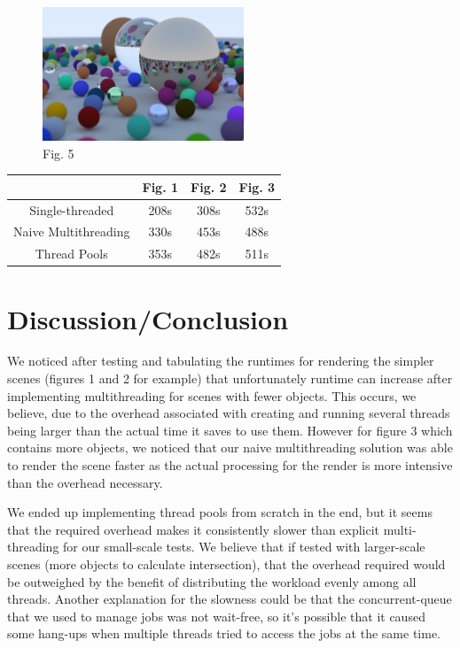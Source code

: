 \documentclass[conference]{IEEEtran}
\begin{document}
\begin{figure}[H]
\includegraphics[width=6cm]{images/FinalRender.png}
\centering\\
Fig. 5
\end{figure}

\begin{center}
\begin{tabular}{||c c c c||} 
 \hline
  & Fig. 1  & Fig. 2 & Fig. 3 \\ [0.5ex] 
 \hline\hline
 Single-threaded & 208s & 308s & 532s \\ 
 \hline
 Naive Multithreading & 330s & 453s & 488s \\
 \hline
 Thread Pools & 353s & 482s & 511s \\
 \hline
\end{tabular}
\end{center}

\section{Discussion/Conclusion}
We noticed after testing and tabulating the runtimes for rendering the simpler scenes (figures 1 and 2 for example) that unfortunately runtime can increase after implementing multithreading for scenes with fewer objects. This occurs, we believe, due to the overhead associated with creating and running several threads being larger than the actual time it saves to use them. However for figure 3 which contains more objects, we noticed that our naive multithreading solution was able to render the scene faster as the actual processing for the render is more intensive than the overhead necessary.

We ended up implementing thread pools from scratch in the end, but it seems that the required overhead makes it consistently slower than explicit multi-threading for our small-scale tests. We believe that if tested with larger-scale scenes (more objects to calculate intersection), that the overhead required would be outweighed by the benefit of distributing the workload evenly among all threads. Another explanation for the slowness could be that the concurrent-queue that we used to manage jobs was not wait-free, so it's possible that it caused some hang-ups when multiple threads tried to access the jobs at the same time.
\end{document}
